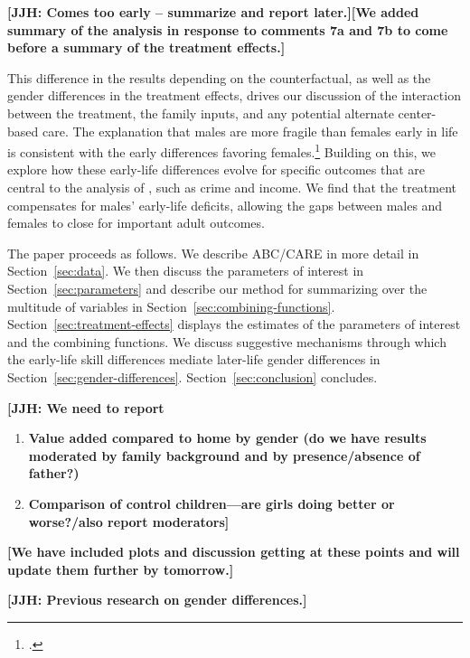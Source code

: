 \textbf{[JJH: Comes too early -- summarize and report later.][We added summary of the analysis in response to comments 7a and 7b to come before a summary of the treatment effects.]}

This difference in the results depending on the counterfactual, as well as the gender differences in the treatment effects, drives our discussion of the interaction between the treatment, the family inputs, and any potential alternate center-based care. The explanation that males are more fragile than females early in life is consistent with the early differences favoring females.\footnote{\citet{Kottelenberg-Lehrer_2014_Gender-Effects,Baker_Gruber_Milligan_2015_Noncog_Defects, Schore_2017_IMHJ}.} Building on this, we explore how these early-life differences evolve for specific outcomes that are central to the analysis of  \citet{Garcia_Heckman_Leaf_etal_2017_Comp_CBA_Unpublished}, such as crime and income. We find that the treatment compensates for males' early-life deficits, allowing the gaps between males and females to close for important adult outcomes.

The paper proceeds as follows. We describe ABC/CARE in more detail in Section~\ref{sec:data}. We then discuss the parameters of interest in Section~\ref{sec:parameters} and describe our method for summarizing over the multitude of variables in Section~\ref{sec:combining-functions}. Section~\ref{sec:treatment-effects} displays the estimates of the parameters of interest and the combining functions. We discuss suggestive mechanisms through which the early-life skill differences mediate later-life gender differences in Section~\ref{sec:gender-differences}. Section~\ref{sec:conclusion} concludes.


\textbf{[JJH: We need to report}
\begin{enumerate}[7(a)]
\item \textbf{Value added compared to home by gender (do we have results moderated by family background and by presence/absence of father?)}
\item \textbf{Comparison of control children---are girls doing better or worse?/also report moderators]}
\end{enumerate}

\textbf{[We have included plots and discussion getting at these points and will update them further by tomorrow.]}

\textbf{[JJH: Previous research on gender differences.]}

